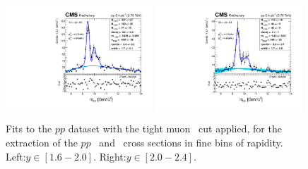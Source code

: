 \begin{figure}
  \includegraphics[width=0.49\textwidth]{Chapters/aYield/pp/pt_4_4/Rap/Rap_1p6_2/pp2p76tev_Rap_1p6_2_fsr1.pdf}  
  \includegraphics[width=0.49\textwidth]{Chapters/aYield/pp/pt_4_4/Rap/Rap_2_2p4/pp2p76tev_Rap_2_2p4_fsr1.pdf}  
  \caption{Fits to the $pp$ dataset with the tight muon \pt\ cut
    applied, for the extraction of the $pp$ \PgUb\ and \PgUc\ cross
    sections in fine bins of rapidity. Left:$y\in [1.6 - 2.0]$. Right:$y\in [2.0 - 2.4]$.}
  \label{fig:YieldsErfExp_2S3Sf} 
\end{figure}


\clearpage

